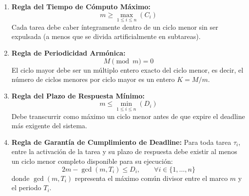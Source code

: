 \begin{tcolorbox}[colback=scdLightAccent,colframe=scdAccent,title=\textbf{Condiciones de Diseño del Ciclo Menor $m$},arc=3pt]
\begin{enumerate}[leftmargin=*]
    \item \textbf{Regla del Tiempo de Cómputo Máximo:}
    \begin{equation}
    m \ge \max_{1 \le i \le n} (C_i)
    \end{equation}
    Cada tarea debe caber íntegramente dentro de un ciclo menor sin ser expulsada (a menos que se divida artificialmente en subtareas).
    
    \item \textbf{Regla de Periodicidad Armónica:}
    \begin{equation}
    M \pmod m = 0
    \end{equation}
    El ciclo mayor debe ser un múltiplo entero exacto del ciclo menor, es decir, el número de ciclos menores por ciclo mayor es un entero $K = M / m$.
    
    \item \textbf{Regla del Plazo de Respuesta Mínimo:}
    \begin{equation}
    m \le \min_{1 \le i \le n} (D_i)
    \end{equation}
    Debe transcurrir como máximo un ciclo menor antes de que expire el deadline más exigente del sistema.
    
    \item \textbf{Regla de Garantía de Cumplimiento de Deadline:}
    Para toda tarea $\tau_i$, entre la activación de la tarea y su plazo de respuesta debe existir al menos un ciclo menor completo disponible para su ejecución:
    \begin{equation}
    2m - \gcd(m, T_i) \le D_i, \qquad \forall i \in \{1, \dots, n\}
    \end{equation}
    donde $\gcd(m, T_i)$ representa el máximo común divisor entre el marco $m$ y el periodo $T_i$.
\end{enumerate}
\end{tcolorbox}

